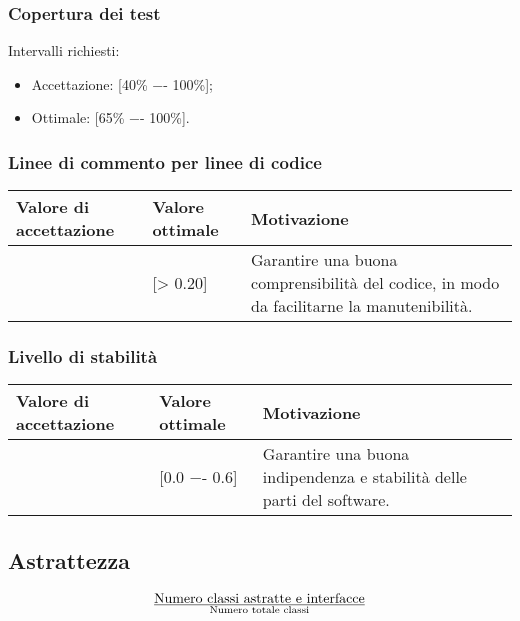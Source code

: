 \subsubsection{Copertura dei test}
Intervalli richiesti:
\begin{itemize}
\item
Accettazione: [40\% −- 100\%];
\item
Ottimale: [65\% −- 100\%].
\end{itemize}

\subsubsection{Linee di commento per linee di codice}

\begin{center}
		\begin{tabular}{|P{2.5cm}|P{2.5cm}|P{6cm}|}
		\hline
			\textbf{Valore di accettazione}	& \textbf{Valore ottimale} & \textbf{Motivazione} \\
			\hline
			[> 0.15] & [> 0.20] &	Garantire una buona comprensibilità del codice, in modo da facilitarne la manutenibilità. \\
			\hline
			\end{tabular}
\end{center}

\subsubsection{Livello di stabilità}

\begin{center}
		\begin{tabular}{|P{2.5cm}|P{2.5cm}|P{6cm}|}
		\hline
			\textbf{Valore di accettazione}	& \textbf{Valore ottimale} & \textbf{Motivazione} \\
			\hline
			[0.0 −- 1] & [0.0 −- 0.6] &	Garantire una buona indipendenza e stabilità delle parti del software. \\
			\hline
			\end{tabular}
\end{center}

\subsection{Astrattezza}

\begin{displaymath}
{\text{Numero classi astratte e interfacce}}\over{\text{Numero totale classi}}
\end{displaymath}

